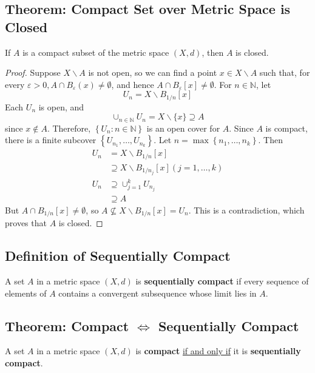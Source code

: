 \documentclass[11pt]{elegantbook}
\begin{document}
\subsection{Theorem: Compact Set over Metric Space is Closed}
\begin{theorem}
    If $A$ is a compact subset of the metric space $(X, d)$, then $A$ is closed.
\end{theorem}
\begin{proof}
    Suppose $X \backslash A$ is not open, so we can find a point $x \in X \backslash A$ such that, for every $\varepsilon>0, A \cap B_{\varepsilon}(x) \neq \emptyset$, and hence $A \cap B_{\varepsilon}[x] \neq \emptyset$. For $n \in \mathbb{N}$, let
    $$
    U_n=X \backslash B_{1 / n}[x]
    $$
    Each $U_n$ is open, and
    $$
    \cup_{n \in \mathbb{N}} U_n=X \backslash\{x\} \supseteq A
    $$
    since $x \notin A$. Therefore, $\left\{U_n: n \in \mathbb{N}\right\}$ is an open cover for $A$. Since $A$ is compact, there is a finite subcover $\left\{U_{n_1}, \ldots, U_{n_k}\right\}$. Let $n=\max \left\{n_1, \ldots, n_k\right\}$. Then
    $$
    \begin{aligned}
    U_n & =X \backslash B_{1 / n}[x] \\
    & \supseteq X \backslash B_{1 / n_j}[x](j=1, \ldots, k) \\
    U_n & \supseteq \cup_{j=1}^k U_{n_j} \\
    & \supseteq A
    \end{aligned}
    $$
    But $A \cap B_{1 / n}[x] \neq \emptyset$, so $A \nsubseteq X \backslash B_{1 / n}[x]=U_n$. This is a contradiction, which proves that $A$ is closed.
\end{proof}

\subsection{Definition of Sequentially Compact}
\begin{definition}
    \normalfont
    A set $A$ in a metric space $(X, d)$ is \textbf{sequentially compact} if every sequence of elements of $A$ contains a convergent subsequence whose limit lies in $A$.
\end{definition}

\subsection{Theorem: Compact $\Leftrightarrow$ Sequentially Compact}
\begin{theorem}
    A set $A$ in a metric space $(X, d)$ is \textbf{compact} \underline{if and only if} it is \textbf{sequentially compact}.
\end{theorem}
\end{document}
